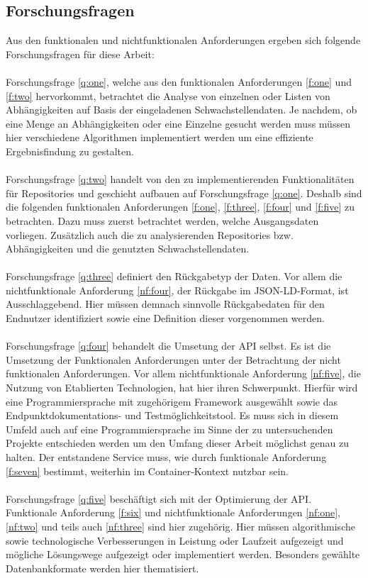 \subsection{Forschungsfragen} \label{sec:Forschungsfragen}
    Aus den funktionalen und nichtfunktionalen Anforderungen ergeben sich folgende Forschungsfragen für diese Arbeit:
    \\ \\
    Forschungsfrage \ref{q:one}, welche aus den funktionalen Anforderungen \ref{f:one} und \ref{f:two} hervorkommt, betrachtet die Analyse von einzelnen oder Listen von Abhängigkeiten auf Basis der eingeladenen Schwachstellendaten.
    Je nachdem, ob eine Menge an Abhängigkeiten oder eine Einzelne gesucht werden muss müssen hier verschiedene Algorithmen implementiert werden um eine effiziente Ergebnisfindung zu gestalten.
    \\ \\
    Forschungsfrage \ref{q:two} handelt von den zu implementierenden Funktionalitäten für Repositories und geschieht aufbauen auf Forschungsfrage \ref{q:one}.
    Deshalb sind die folgenden funktionalen Anforderungen \ref{f:one}, \ref{f:three}, \ref{f:four} und \ref{f:five} zu betrachten.
    Dazu muss zuerst betrachtet werden, welche Ausgangsdaten vorliegen.
    Zusätzlich auch die zu analysierenden Repositories bzw. Abhängigkeiten und die genutzten Schwachstellendaten.
    \\ \\
    Forschungsfrage \ref{q:three} definiert den Rückgabetyp der Daten.
    Vor allem die nichtfunktionale Anforderung \ref{nf:four}, der Rückgabe im JSON-LD-Format, ist Ausschlaggebend.
    Hier müssen demnach sinnvolle Rückgabedaten für den Endnutzer identifiziert sowie eine Definition dieser vorgenommen werden.
    \\ \\
    Forschungsfrage \ref{q:four} behandelt die Umsetung der API selbst.
    Es ist die Umsetzung der Funktionalen Anforderungen unter der Betrachtung der nicht funktionalen Anforderungen.
    Vor allem nichtfunktionale Anforderung \ref{nf:five}, die Nutzung von Etablierten Technologien, hat hier ihren Schwerpunkt.
    Hierfür wird eine Programmiersprache mit zugehörigem Framework ausgewählt sowie das End\-punkt\-doku\-mentations- und Test\-möglich\-keits\-tool.
    Es muss sich in diesem Umfeld auch auf eine Programmiersprache im Sinne der zu untersuchenden Projekte entschieden werden um den Umfang dieser Arbeit möglichst genau zu halten.
    Der entstandene Service muss, wie durch funktionale Anforderung \ref{f:seven} bestimmt, weiterhin im Container-Kontext nutzbar sein.
    \\ \\
    Forschungsfrage \ref{q:five} beschäftigt sich mit der Optimierung der API.
    Funktionale Anforderung \ref{f:six} und nichtfunktionale Anforderungen \ref{nf:one}, \ref{nf:two} und teils auch \ref{nf:three} sind hier zugehörig.
    Hier müssen algorithmische sowie technologische Verbesserungen in Leistung oder Laufzeit aufgezeigt und mögliche Lösungswege aufgezeigt oder implementiert werden.
    Besonders gewählte Datenbankformate werden hier thematisiert.

    
    